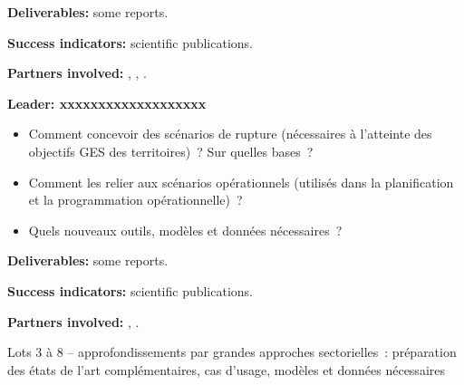 





\vspace{0.25cm}
\noindent\textbf{Deliverables:} some reports.

\noindent\textbf{Success indicators:} scientific publications.

\noindent\textbf{Partners involved:} , , .





\textbf{Leader: xxxxxxxxxxxxxxxxxxx}


\begin{itemize}
    \item Comment concevoir des scénarios de rupture (nécessaires à l’atteinte des objectifs GES des territoires) ? Sur quelles bases ?
    \item Comment les relier aux scénarios opérationnels (utilisés dans la planification et la programmation opérationnelle) ? 
    \item Quels nouveaux outils, modèles et données nécessaires ? 
\end{itemize}




\vspace{0.25cm}
\noindent\textbf{Deliverables:} some reports.

\noindent\textbf{Success indicators:} scientific publications.

\noindent\textbf{Partners involved:} , .






Lots 3 à 8 – approfondissements par grandes approches sectorielles : préparation des états de l’art complémentaires, cas d’usage, modèles et données nécessaires

